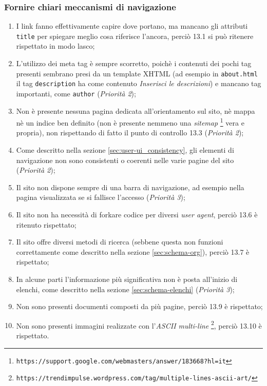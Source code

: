 \subsubsection{Fornire chiari meccanismi di navigazione}
\begin{enumerate}
\item I link fanno effettivamente capire dove portano, ma mancano gli
attributi \texttt{title} per spiegare meglio cosa riferisce l'ancora, perciò
13.1 si può ritenere rispettato in modo lasco;
\item L'utilizzo dei meta tag è sempre scorretto, poichè i contenuti dei pochi
tag presenti sembrano presi da un template XHTML (ad esempio in
\texttt{about.html} il tag \texttt{description} ha come contenuto
\textit{Inserisci le descrizioni}) e mancano tag importanti, come
\texttt{author} (\textit{Priorità 2});
\item Non è presente nessuna pagina dedicata all'orientamento sul sito, nè
mappa nè un indice ben definito (non è presente nemmeno una \textit{sitemap}
\footnote{\texttt{https://support.google.com/webmasters/answer/183668?hl=it}}
vera e propria), non rispettando di fatto il punto di controllo 13.3
(\textit{Priorità 2});
\item Come descritto nella sezione \ref{sec:user-ui_consistency}, gli elementi
di navigazione non sono consistenti o coerenti nelle varie pagine del sito
(\textit{Priorità 2});
\item Il sito non dispone sempre di una barra di navigazione, ad esempio nella
pagina visualizzata se si fallisce l'accesso (\textit{Priorità 3});
\item Il sito non ha necessità di forkare codice per diversi
\textit{user agent}, perciò 13.6 è ritenuto rispettato;
\item Il sito offre diversi metodi di ricerca (sebbene questa non funzioni
correttamente come descritto nella sezione \ref{sec:schema-org}), perciò 13.7
è rispettato;
\item In alcune parti l'informazione più significativa non è posta all'inizio
di elenchi, come descritto nella sezione \ref{sec:schema-elenchi}
(\textit{Priorità 3});
\item Non sono presenti documenti composti da più pagine, perciò 13.9 è
rispettato;
\item Non sono presenti immagini realizzate con l'\textit{ASCII multi-line}
\footnote{\texttt{https://trendimpulse.wordpress.com/tag/multiple-lines-ascii-art/}}, perciò 13.10 è rispettato.
\end{enumerate}

